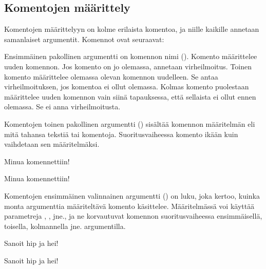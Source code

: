 \subsection{Komentojen määrittely}
\label{luku:komennot-määr}

Komentojen määrittelyyn on kolme erilaista komentoa, ja niille kaikille
annetaan samanlaiset argumentit. Komennot ovat seuraavat:

\begin{koodilohkosis}
  \newcommand     {\nimi}[n][oletus]{määritelmä}
  \renewcommand   {\nimi}[n][oletus]{määritelmä}
  \providecommand {\nimi}[n][oletus]{määritelmä}
\end{koodilohkosis}

Ensimmäinen pakollinen argumentti on komennon nimi ().
Komento  määrittelee uuden komennon. Jos komento
on jo olemassa, annetaan virheilmoitus. Toinen komento  määrittelee olemassa olevan komennon uudelleen. Se antaa
virheilmoituksen, jos komentoa ei ollut olemassa. Kolmas komento
 puolestaan määrittelee uuden komennon vain
siinä tapauksessa, että sellaista ei ollut ennen olemassa. Se ei anna
virheilmoitusta.

Komentojen toinen pakollinen argumentti () sisältää
komennon määritelmän eli mitä tahansa tekstiä tai komentoja.
Suoritusvaiheessa komento ikään kuin vaihdetaan sen määritelmäksi.

\begin{koodilohkosis}
  \newcommand{\komento}{Minua komennettiin!}
  \komento
\end{koodilohkosis}

\begin{tulossis}
  Minua komennettiin!
\end{tulossis}

Komentojen ensimmäinen valinnainen argumentti () on luku, joka
kertoo, kuinka monta argumenttia määriteltävä komento käsittelee.
Määritelmässä voi käyttää parametreja , ,
 jne., ja ne korvautuvat komennon suoritusvaiheessa
ensimmäisellä, toisella, kolmannella jne. argumentilla.

\begin{koodilohkosis}
  \newcommand{\komento}[2]{Sanoit #1 ja #2!}
  \komento{hip}{hei}
\end{koodilohkosis}

\begin{tulossis}
  Sanoit hip ja hei!
\end{tulossis}

